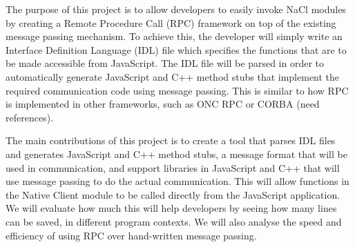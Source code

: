 The purpose of this project is to allow developers to easily invoke NaCl modules by creating a Remote Procedure Call (RPC) framework on top of the existing message passing mechanism. To achieve this, the developer will simply write an Interface Definition Language (IDL) file which specifies the functions that are to be made accessible from JavaScript. The IDL file will be parsed in order to automatically generate JavaScript and C++ method stubs that implement the required communication code using message passing. This is similar to how RPC is implemented in other frameworks, such as ONC RPC or CORBA (need references).

The main contributions of this project is to create a tool that parses IDL files and generates JavaScript and C++ method stubs, a message format that will be used in communication, and support libraries in JavaScript and C++ that will use message passing to do the actual communication. This will allow functions in the Native Client module to be called directly from the JavaScript application. We will evaluate how much this will help developers by seeing how many lines can be saved, in different program contexts. We will also analyse the speed and efficiency of using RPC over hand-written message passing. 